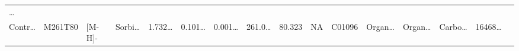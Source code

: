 \documentclass[
]{article}
\begin{document}
\begin{longtable}[]{@{}llllllllllllllll@{}}
\begin{minipage}[t]{0.02\columnwidth}
\ldots{}\strut
\end{minipage}\tabularnewline
\begin{minipage}[t]{0.04\columnwidth}\raggedright
Contr\ldots{}\strut
\end{minipage} & \begin{minipage}[t]{0.04\columnwidth}\raggedright
M261T80\strut
\end{minipage} & \begin{minipage}[t]{0.04\columnwidth}\raggedright
{[}M-H{]}-\strut
\end{minipage} & \begin{minipage}[t]{0.04\columnwidth}\raggedright
Sorbi\ldots{}\strut
\end{minipage} & \begin{minipage}[t]{0.04\columnwidth}\raggedright
1.732\ldots{}\strut
\end{minipage} & \begin{minipage}[t]{0.04\columnwidth}\raggedright
0.101\ldots{}\strut
\end{minipage} & \begin{minipage}[t]{0.04\columnwidth}\raggedright
0.001\ldots{}\strut
\end{minipage} & \begin{minipage}[t]{0.04\columnwidth}\raggedright
261.0\ldots{}\strut
\end{minipage} & \begin{minipage}[t]{0.04\columnwidth}\raggedright
80.323\strut
\end{minipage} & \begin{minipage}[t]{0.04\columnwidth}\raggedright
NA\strut
\end{minipage} & \begin{minipage}[t]{0.03\columnwidth}\raggedright
C01096\strut
\end{minipage} & \begin{minipage}[t]{0.04\columnwidth}\raggedright
Organ\ldots{}\strut
\end{minipage} & \begin{minipage}[t]{0.04\columnwidth}\raggedright
Organ\ldots{}\strut
\end{minipage} & \begin{minipage}[t]{0.04\columnwidth}\raggedright
Carbo\ldots{}\strut
\end{minipage} & \begin{minipage}[t]{0.04\columnwidth}\raggedright
16468\ldots{}\strut
\end{minipage} & \begin{minipage}[t]{0.02\columnwidth}\raggedright

\end{minipage}
\end{longtable}
\end{document}
